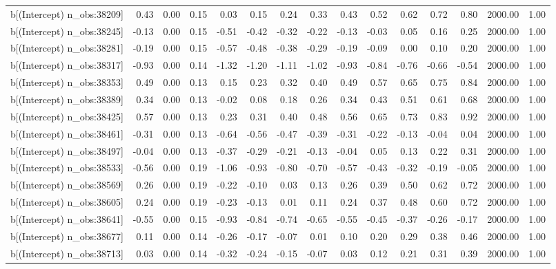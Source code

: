 \begin{table}[ht]
\begin{tabular}{rrrrrrrrrrrrrrr}
  b[(Intercept) n\_obs:38209] & 0.43 & 0.00 & 0.15 & 0.03 & 0.15 & 0.24 & 0.33 & 0.43 & 0.52 & 0.62 & 0.72 & 0.80 & 2000.00 & 1.00 \\ 
  b[(Intercept) n\_obs:38245] & -0.13 & 0.00 & 0.15 & -0.51 & -0.42 & -0.32 & -0.22 & -0.13 & -0.03 & 0.05 & 0.16 & 0.25 & 2000.00 & 1.00 \\ 
  b[(Intercept) n\_obs:38281] & -0.19 & 0.00 & 0.15 & -0.57 & -0.48 & -0.38 & -0.29 & -0.19 & -0.09 & 0.00 & 0.10 & 0.20 & 2000.00 & 1.00 \\ 
  b[(Intercept) n\_obs:38317] & -0.93 & 0.00 & 0.14 & -1.32 & -1.20 & -1.11 & -1.02 & -0.93 & -0.84 & -0.76 & -0.66 & -0.54 & 2000.00 & 1.00 \\ 
  b[(Intercept) n\_obs:38353] & 0.49 & 0.00 & 0.13 & 0.15 & 0.23 & 0.32 & 0.40 & 0.49 & 0.57 & 0.65 & 0.75 & 0.84 & 2000.00 & 1.00 \\ 
  b[(Intercept) n\_obs:38389] & 0.34 & 0.00 & 0.13 & -0.02 & 0.08 & 0.18 & 0.26 & 0.34 & 0.43 & 0.51 & 0.61 & 0.68 & 2000.00 & 1.00 \\ 
  b[(Intercept) n\_obs:38425] & 0.57 & 0.00 & 0.13 & 0.23 & 0.31 & 0.40 & 0.48 & 0.56 & 0.65 & 0.73 & 0.83 & 0.92 & 2000.00 & 1.00 \\ 
  b[(Intercept) n\_obs:38461] & -0.31 & 0.00 & 0.13 & -0.64 & -0.56 & -0.47 & -0.39 & -0.31 & -0.22 & -0.13 & -0.04 & 0.04 & 2000.00 & 1.00 \\ 
  b[(Intercept) n\_obs:38497] & -0.04 & 0.00 & 0.13 & -0.37 & -0.29 & -0.21 & -0.13 & -0.04 & 0.05 & 0.13 & 0.22 & 0.31 & 2000.00 & 1.00 \\ 
  b[(Intercept) n\_obs:38533] & -0.56 & 0.00 & 0.19 & -1.06 & -0.93 & -0.80 & -0.70 & -0.57 & -0.43 & -0.32 & -0.19 & -0.05 & 2000.00 & 1.00 \\ 
  b[(Intercept) n\_obs:38569] & 0.26 & 0.00 & 0.19 & -0.22 & -0.10 & 0.03 & 0.13 & 0.26 & 0.39 & 0.50 & 0.62 & 0.72 & 2000.00 & 1.00 \\ 
  b[(Intercept) n\_obs:38605] & 0.24 & 0.00 & 0.19 & -0.23 & -0.13 & 0.01 & 0.11 & 0.24 & 0.37 & 0.48 & 0.60 & 0.72 & 2000.00 & 1.00 \\ 
  b[(Intercept) n\_obs:38641] & -0.55 & 0.00 & 0.15 & -0.93 & -0.84 & -0.74 & -0.65 & -0.55 & -0.45 & -0.37 & -0.26 & -0.17 & 2000.00 & 1.00 \\ 
  b[(Intercept) n\_obs:38677] & 0.11 & 0.00 & 0.14 & -0.26 & -0.17 & -0.07 & 0.01 & 0.10 & 0.20 & 0.29 & 0.38 & 0.46 & 2000.00 & 1.00 \\ 
  b[(Intercept) n\_obs:38713] & 0.03 & 0.00 & 0.14 & -0.32 & -0.24 & -0.15 & -0.07 & 0.03 & 0.12 & 0.21 & 0.31 & 0.39 & 2000.00 & 1.00 \\ 

\end{tabular}
\end{table}
